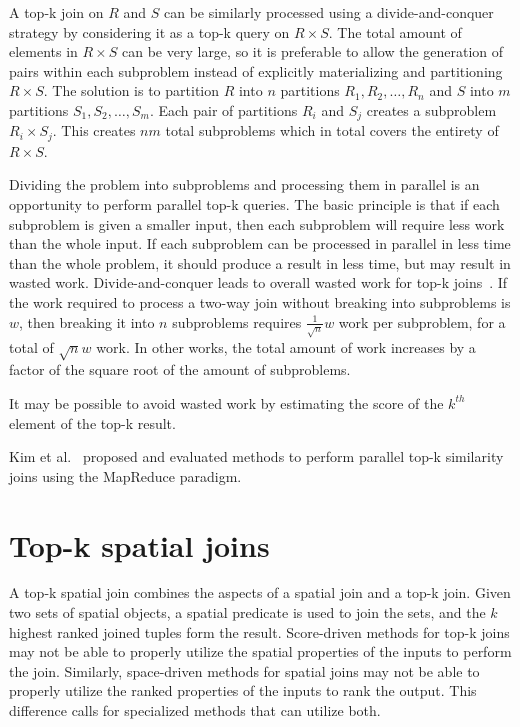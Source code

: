 A top-k join on \(R\) and \(S\) can be similarly processed using a divide-and-conquer strategy by considering it as a top-k query on \(R \times S\). The total amount of elements in \(R \times S\) can be very large, so it is preferable to allow the generation of pairs within each subproblem instead of explicitly materializing and partitioning \(R \times S\). The solution is to partition \(R\) into \(n\) partitions \(R_1, R_2, \dotsc, R_n\) and \(S\) into \(m\) partitions \(S_1, S_2, \dotsc, S_m\). Each pair of partitions \(R_i\) and \(S_j\) creates a subproblem \(R_i \times S_j\). This creates \(nm\) total subproblems which in total covers the entirety of \(R \times S\).

Dividing the problem into subproblems and processing them in parallel is an opportunity to perform parallel top-k queries. The basic principle is that if each subproblem is given a smaller input, then each subproblem will require less work than the whole input. If each subproblem can be processed in parallel in less time than the whole problem, it should produce a result in less time, but may result in wasted work. Divide-and-conquer leads to overall wasted work for top-k joins~\cite{yu2010workload}. If the work required to process a two-way join without breaking into subproblems is \(w\), then breaking it into \(n\) subproblems requires \(\frac{1}{\sqrt{n}} w\) work per subproblem, for a total of \(\sqrt{n} w\) work. In other works, the total amount of work increases by a factor of the square root of the amount of subproblems.

It may be possible to avoid wasted work by estimating the score of the \(k^{th}\) element of the top-k result.

Kim et al.~\cite{kim2012parallel} proposed and evaluated methods to perform parallel top-k similarity joins using the MapReduce paradigm.

\section{Top-k spatial joins}

A top-k spatial join combines the aspects of a spatial join and a top-k join. Given two sets of spatial objects, a spatial predicate is used to join the sets, and the \(k\) highest ranked joined tuples form the result. Score-driven methods for top-k joins may not be able to properly utilize the spatial properties of the inputs to perform the join. Similarly, space-driven methods for spatial joins may not be able to properly utilize the ranked properties of the inputs to rank the output. This difference calls for specialized methods that can utilize both.

